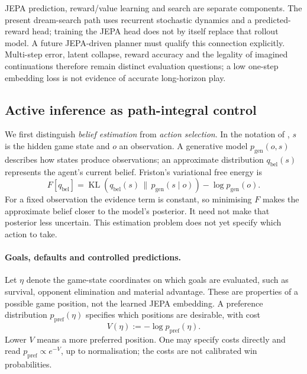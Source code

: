 \documentclass[11pt,a4paper]{article}
\theoremstyle{definition}
\theoremstyle{plain}
\DeclareMathOperator{\KL}{KL}
\begin{document}
JEPA prediction, reward/value learning and search are separate components. The present dream-search path uses recurrent stochastic dynamics and a predicted-reward head; training the JEPA head does not by itself replace that rollout model. A future JEPA-driven planner must qualify this connection explicitly. Multi-step error, latent collapse, reward accuracy and the legality of imagined continuations therefore remain distinct evaluation questions; a low one-step embedding loss is not evidence of accurate long-horizon play.

\subsection{Active inference as path-integral control}
\label{sec:aif}

We first distinguish \emph{belief estimation} from \emph{action selection}. In the notation of , $s$ is the hidden game state and $o$ an observation. A generative model $p_{\mathrm{gen}}(o,s)$ describes how states produce observations; an approximate distribution $q_{\mathrm{bel}}(s)$ represents the agent's current belief. Friston's variational free energy \citep{friston2010free} is
\begin{equation}
F[q_{\mathrm{bel}}]
=\KL\!\left(q_{\mathrm{bel}}(s)\,\|\,p_{\mathrm{gen}}(s\mid o)\right)
 -\log p_{\mathrm{gen}}(o).
\end{equation}
For a fixed observation the evidence term is constant, so minimising $F$ makes the approximate belief closer to the model's posterior. It need not make that posterior less uncertain. This estimation problem does not yet specify which action to take.

\paragraph{Goals, defaults and controlled predictions.} Let $\eta$ denote the game-state coordinates on which goals are evaluated, such as survival, opponent elimination and material advantage. These are properties of a possible game position, not the learned JEPA embedding. A preference distribution $p_{\mathrm{pref}}(\eta)$ specifies which positions are desirable, with cost
\begin{equation}
V(\eta):=-\log p_{\mathrm{pref}}(\eta).
\label{eq:potential}
\end{equation}
Lower $V$ means a more preferred position. One may specify costs directly and read $p_{\mathrm{pref}}\propto e^{-V}$, up to normalisation; the costs are not calibrated win probabilities.
\end{document}
